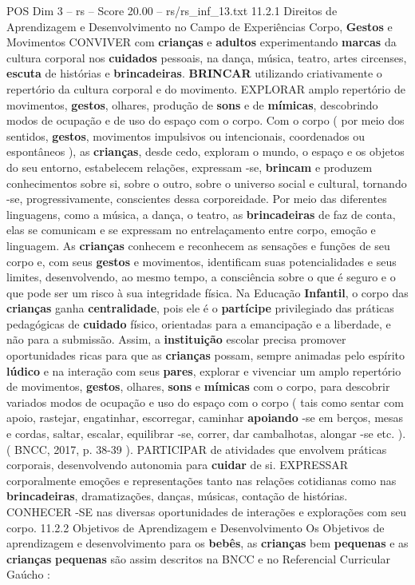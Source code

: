 \begin{textsample}{POS Dim 3 – rs – Score 20.00 – rs/rs\_inf\_13.txt}  \label{ex:f3_pos_246}
11.2.1 Direitos de Aprendizagem e Desenvolvimento no Campo de Experiências Corpo, \textbf{Gestos} e Movimentos CONVIVER com \textbf{crianças} e \textbf{adultos} experimentando \textbf{marcas} da cultura corporal nos \textbf{cuidados} pessoais, na dança, música, teatro, artes circenses, \textbf{escuta} de histórias e \textbf{brincadeiras}. \textbf{BRINCAR} utilizando criativamente o repertório da cultura corporal e do movimento.
EXPLORAR amplo repertório de movimentos, \textbf{gestos}, olhares, produção de \textbf{sons} e de \textbf{mímicas}, descobrindo modos de ocupação e de uso do espaço com o corpo.
Com o corpo ( por meio dos sentidos, \textbf{gestos}, movimentos impulsivos ou intencionais, coordenados ou espontâneos ), as \textbf{crianças}, desde cedo, exploram o mundo, o espaço e os objetos do seu entorno, estabelecem relações, expressam -se, \textbf{brincam} e produzem conhecimentos sobre si, sobre o outro, sobre o universo social e cultural, tornando -se, progressivamente, conscientes dessa corporeidade.
Por meio das diferentes linguagens, como a música, a dança, o teatro, as \textbf{brincadeiras} de faz de conta, elas se comunicam e se expressam no entrelaçamento entre corpo, emoção e linguagem.
As \textbf{crianças} conhecem e reconhecem as sensações e funções de seu corpo e, com seus \textbf{gestos} e movimentos, identificam suas potencialidades e seus limites, desenvolvendo, ao mesmo tempo, a consciência sobre o que é seguro e o que pode ser um risco à sua integridade física.
Na Educação \textbf{Infantil}, o corpo das \textbf{crianças} ganha \textbf{centralidade}, pois ele é o \textbf{partícipe} privilegiado das práticas pedagógicas de \textbf{cuidado} físico, orientadas para a emancipação e a liberdade, e não para a submissão.
Assim, a \textbf{instituição} escolar precisa promover oportunidades ricas para que as \textbf{crianças} possam, sempre animadas pelo espírito \textbf{lúdico} e na interação com seus \textbf{pares}, explorar e vivenciar um amplo repertório de movimentos, \textbf{gestos}, olhares, \textbf{sons} e \textbf{mímicas} com o corpo, para descobrir variados modos de ocupação e uso do espaço com o corpo ( tais como sentar com apoio, rastejar, engatinhar, escorregar, caminhar \textbf{apoiando} -se em berços, mesas e cordas, saltar, escalar, equilibrar -se, correr, dar cambalhotas, alongar -se etc. ). ( BNCC, 2017, p. 38-39 ).
PARTICIPAR de atividades que envolvem práticas corporais, desenvolvendo autonomia para \textbf{cuidar} de si.
EXPRESSAR corporalmente emoções e representações tanto nas relações cotidianas como nas \textbf{brincadeiras}, dramatizações, danças, músicas, contação de histórias.
CONHECER -SE nas diversas oportunidades de interações e explorações com seu corpo. 11.2.2 Objetivos de Aprendizagem e Desenvolvimento Os Objetivos de aprendizagem e desenvolvimento para os \textbf{bebês}, as \textbf{crianças} bem \textbf{pequenas} e as \textbf{crianças} \textbf{pequenas} são assim descritos na BNCC e no Referencial Curricular Gaúcho :

\end{textsample}
